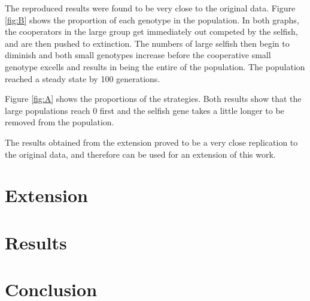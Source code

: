 \documentclass[11pt]{ecsarticle}
\begin{document}
The reproduced results were found to be very close to the original data. 
Figure \ref{fig:B} shows the proportion of each genotype in the population.
In both graphs, the cooperators in the large group get immediately out competed by the selfish, and are then pushed to extinction.
The numbers of large selfish then begin to diminish and both small genotypes increase before the cooperative small genotype excells and results in being the entire of the population.
The population reached a steady state by 100 generations.

Figure \ref{fig:A} shows the proportions of the strategies. 
Both results show that the large populations reach 0 first and the selfish gene takes a little longer to be removed from the population.

The results obtained from the extension proved to be a very close replication to the original data, and therefore can be used for an extension of this work.

\section{Extension}\label{sc:extension}

\section{Results}\label{sc:results}

\section{Conclusion}\label{sc:conclusion}




 
\end{document}
